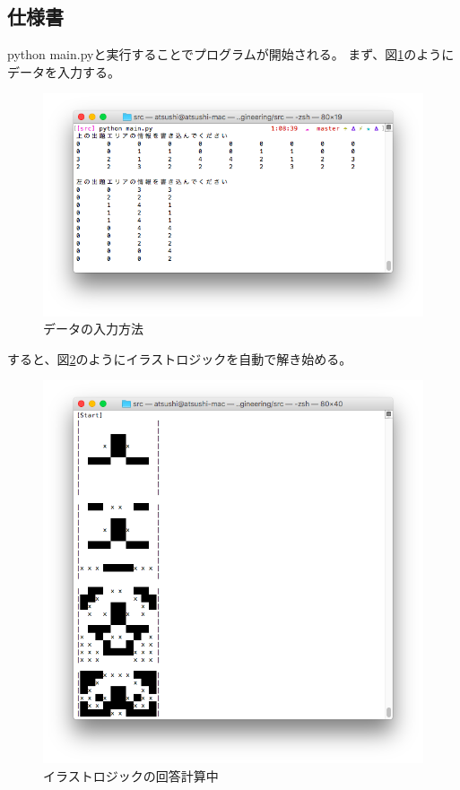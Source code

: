 \documentclass[a4j]{jarticle}
\begin{document}
\subsection{仕様書}
python main.pyと実行することでプログラムが開始される。
まず、図\ref{fig:input}のようにデータを入力する。

\begin{figure}[hp]
\centering
\includegraphics[width=15cm]{./image/input.png}
\caption{データの入力方法}
\label{fig:input}
\end{figure}

すると、図\ref{fig:calc}のようにイラストロジックを自動で解き始める。

\begin{figure}[hp]
\centering
\includegraphics[width=15cm]{./image/calc.png}
\caption{イラストロジックの回答計算中}
\label{fig:calc}
\end{figure}
\end{document}
